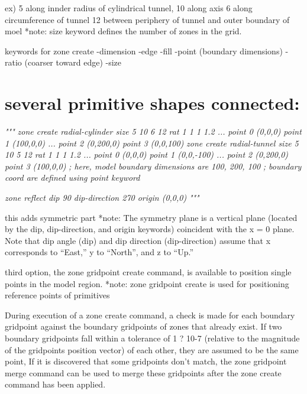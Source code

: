 \documentclass[a4paper, nobind]{templates/ociamthesis}
\newenvironment{Shaded}{\begin{snugshade}}{\end{snugshade}}
\newcommand{\CommentTok}[1]{\textcolor[rgb]{0.56,0.35,0.01}{\textit{#1}}}
\renewenvironment{Shaded}
{
  \vspace{10pt}%
  \begin{snugshade}%
}{%
  \end{snugshade}%
  \vspace{8pt}%
}
\begin{document}
ex) 5 along innder radius of cylindrical tunnel,
10 along axis
6 along circumference of tunnel
12 between periphery of tunnel and outer boundary of moel
*note: size keyword defines the number of zones in the grid.

keywords for zone create
-dimension
-edge
-fill
-point (boundary dimensions)
-ratio (coarser toward edge)
-size

\hypertarget{several-primitive-shapes-connected}{%
\section{several primitive shapes connected:}\label{several-primitive-shapes-connected}}

\begin{Shaded}
\begin{Highlighting}[]
\CommentTok{"""}
\CommentTok{zone create radial{-}cylinder size 5 10 6 12 rat 1 1 1 1.2 ...}
\CommentTok{                           point 0 (0,0,0) point 1 (100,0,0) ...}
\CommentTok{                           point 2 (0,200,0) point 3 (0,0,100)}
\CommentTok{zone create radial{-}tunnel size 5 10 5 12 rat 1 1 1 1.2 ...}
\CommentTok{                          point 0 (0,0,0) point 1 (0,0,{-}100) ...}
\CommentTok{                          point 2 (0,200,0) point 3 (100,0,0)}
\CommentTok{; here, model boundary dimensions are 100, 200, 100}
\CommentTok{; boundary coord are defined using point keyword}

\CommentTok{zone reflect dip 90 dip{-}direction 270 origin (0,0,0) }
\CommentTok{"""}
\end{Highlighting}
\end{Shaded}

this adds symmetric part
*note: The symmetry plane is a vertical plane (located by the dip, dip-direction, and origin keywords) coincident with the x = 0 plane. Note that dip angle (dip) and dip direction (dip-direction) assume that x corresponds to ``East,'' y to ``North'', and z to ``Up.''

third option, the zone gridpoint create command, is available to position single points in the model region.
*note: zone gridpoint create is used for positioning reference points of primitives

During execution of a zone create command, a check is made for each boundary gridpoint against the boundary gridpoints of zones that already exist.
If two boundary gridpoints fall within a tolerance of 1 ? 10-7 (relative to the magnitude of the gridpoints position vector) of each other, they are assumed to be the same point,
If it is discovered that some gridpoints don't match, the zone gridpoint merge command can be used to merge these gridpoints after the zone create command has been applied.
\end{document}
